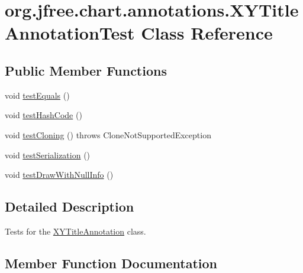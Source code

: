 \hypertarget{classorg_1_1jfree_1_1chart_1_1annotations_1_1_x_y_title_annotation_test}{}\section{org.\+jfree.\+chart.\+annotations.\+X\+Y\+Title\+Annotation\+Test Class Reference}
\label{classorg_1_1jfree_1_1chart_1_1annotations_1_1_x_y_title_annotation_test}
\subsection*{Public Member Functions}
\begin{DoxyCompactItemize}
\item 
void \mbox{\hyperlink{classorg_1_1jfree_1_1chart_1_1annotations_1_1_x_y_title_annotation_test_a624d69159206cb2d5b8e366cb7dfc4b5}{test\+Equals}} ()
\item 
void \mbox{\hyperlink{classorg_1_1jfree_1_1chart_1_1annotations_1_1_x_y_title_annotation_test_afe525cfbf5249bf24114537f969b74bf}{test\+Hash\+Code}} ()
\item 
void \mbox{\hyperlink{classorg_1_1jfree_1_1chart_1_1annotations_1_1_x_y_title_annotation_test_af01b9f8e8af9636d4fecf17b2cb05005}{test\+Cloning}} ()  throws Clone\+Not\+Supported\+Exception 
\item 
void \mbox{\hyperlink{classorg_1_1jfree_1_1chart_1_1annotations_1_1_x_y_title_annotation_test_ac45e1d4075c322480656d0dc2dd2f4c2}{test\+Serialization}} ()
\item 
void \mbox{\hyperlink{classorg_1_1jfree_1_1chart_1_1annotations_1_1_x_y_title_annotation_test_a797bc29efd80ab155073a06c49951721}{test\+Draw\+With\+Null\+Info}} ()
\end{DoxyCompactItemize}


\subsection{Detailed Description}
Tests for the \mbox{\hyperlink{classorg_1_1jfree_1_1chart_1_1annotations_1_1_x_y_title_annotation}{X\+Y\+Title\+Annotation}} class. 

\subsection{Member Function Documentation}
\mbox{\label{classorg_1_1jfree_1_1chart_1_1annotations_1_1_x_y_title_annotation_test_af01b9f8e8af9636d4fecf17b2cb05005}} 
